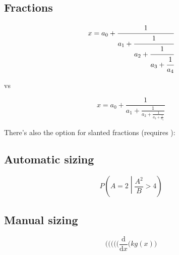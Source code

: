 \subsection*{Fractions}

\begin{example}
\[
x = a_0 + \cfrac{1}{a_1 
          + \cfrac{1}{a_2 
            + \cfrac{1}{a_3 +\cfrac{1}{a_4} } } }
\]
\end{example}

vs
    
\begin{example}
\[
x = a_0 + \frac{1}{a_1 
          + \frac{1}{a_2 
            + \frac{1}{a_3 + \frac{1}{a_4} } } }
\]
\end{example}

There's also the option for slanted fractions (requires ):\\

\subsection*{Automatic sizing}
\begin{example}
\[
P\left(A=2\middle|\frac{A^2}{B}>4\right)
\]
\end{example}

\subsection*{Manual sizing}
\begin{example}
\[
( \big( \Big( \bigg( \Bigg(
\frac{\mathrm d}{\mathrm d x} \big( k g(x) \big)
\]
\end{example}

